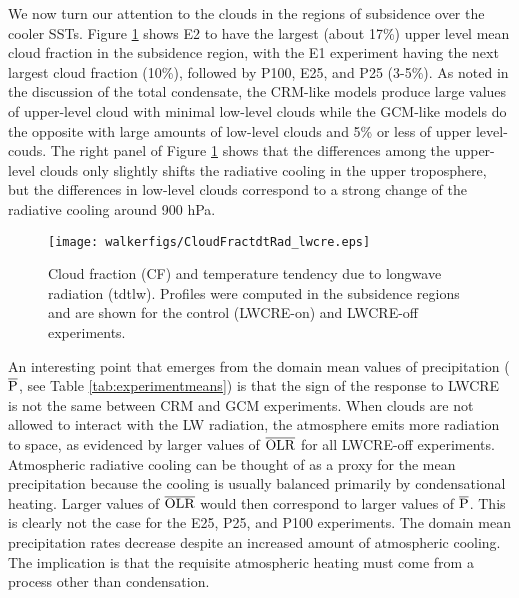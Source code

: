 \documentclass[draft]{agujournal2019}
\begin{document}
{We now turn our attention to the clouds in the regions of subsidence over the cooler SSTs.
Figure \ref{fig:cf_tdtlw} shows E2 to have the largest (about 17\%) upper level mean cloud
fraction in the subsidence region, with the E1 experiment having the next largest cloud fraction (10\%), followed by 
P100, E25, and P25 (3-5\%).  As noted in the discussion of the total condensate, the CRM-like models 
produce large values of upper-level cloud with minimal low-level clouds while the GCM-like models
do the opposite with large amounts of low-level clouds and 5\% or less of upper level-couds.   
The right panel of Figure \ref{fig:cf_tdtlw} shows that the differences among the upper-level clouds only slightly shifts the radiative cooling in the
upper troposphere, but the differences in low-level clouds correspond to a strong change of the radiative cooling around 900 hPa. 


\begin{figure}
  \centering
      \texttt{[image: walkerfigs/CloudFractdtRad\_lwcre.eps]}
  \caption{Cloud fraction (CF) and temperature tendency due to longwave radiation (tdtlw).  Profiles were computed in the 
  subsidence regions and are shown for the control (LWCRE-on) and LWCRE-off experiments.}
  \label{fig:cf_tdtlw}
\end{figure}

An interesting point that emerges from the domain mean values of precipitation ($\overline{\rm{P}}$, see Table \ref{tab:experimentmeans}) 
is that the sign of the response to LWCRE is not the same between CRM and GCM experiments.
When clouds are not allowed to interact with the LW radiation, the atmosphere 
emits more radiation to space, as evidenced by larger values of $\overline{\rm{OLR}}$ 
for all LWCRE-off experiments.  Atmospheric radiative cooling can be thought of 
as a proxy for the mean precipitation because the cooling is usually balanced primarily by 
condensational heating.  Larger values of $\overline{\rm{OLR}}$ would then correspond to 
larger values of $\overline{\rm{P}}$.  This is clearly not the case for the E25, P25, and 
P100 experiments.   The domain mean precipitation rates decrease despite an increased 
amount of atmospheric cooling.  The implication is that the requisite atmospheric heating 
must come from a process other than condensation.  

}
\end{document}
